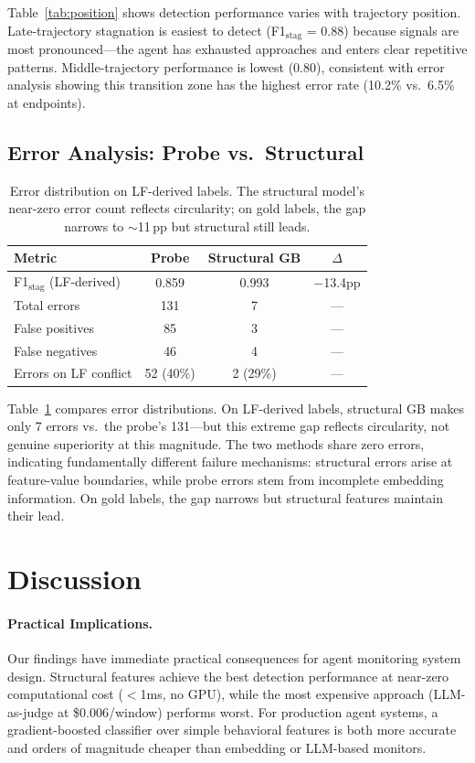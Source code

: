 \documentclass[11pt,a4paper]{article}
\begin{document}
Table~\ref{tab:position} shows detection performance varies with trajectory position.
Late-trajectory stagnation is easiest to detect (F1$_\text{stag}$ = 0.88) because signals are most pronounced---the agent has exhausted approaches and enters clear repetitive patterns.
Middle-trajectory performance is lowest (0.80), consistent with error analysis showing this transition zone has the highest error rate (10.2\% vs.\ 6.5\% at endpoints).

\subsection{Error Analysis: Probe vs.\ Structural}

\begin{table}[t]
\centering
\small
\begin{tabular}{lccc}
\toprule
Metric & Probe & Structural GB & $\Delta$ \\
\midrule
F1$_\text{stag}$ (LF-derived) & 0.859 & 0.993 & $-$13.4pp \\
Total errors & 131 & 7 & --- \\
False positives & 85 & 3 & --- \\
False negatives & 46 & 4 & --- \\
Errors on LF conflict & 52 (40\%) & 2 (29\%) & --- \\
\bottomrule
\end{tabular}
\caption{Error distribution on LF-derived labels. The structural model's near-zero error count reflects circularity; on gold labels, the gap narrows to $\sim$11\,pp but structural still leads.}
\label{tab:error-analysis}
\end{table}

Table~\ref{tab:error-analysis} compares error distributions.
On LF-derived labels, structural GB makes only 7 errors vs.\ the probe's 131---but this extreme gap reflects circularity, not genuine superiority at this magnitude.
The two methods share zero errors, indicating fundamentally different failure mechanisms: structural errors arise at feature-value boundaries, while probe errors stem from incomplete embedding information.
On gold labels, the gap narrows but structural features maintain their lead.

\section{Discussion}

\paragraph{Practical Implications.}
Our findings have immediate practical consequences for agent monitoring system design.
Structural features achieve the best detection performance at near-zero computational cost ($<$1ms, no GPU), while the most expensive approach (LLM-as-judge at \$0.006/window) performs worst.
For production agent systems, a gradient-boosted classifier over simple behavioral features is both more accurate and orders of magnitude cheaper than embedding or LLM-based monitors.
\end{document}
